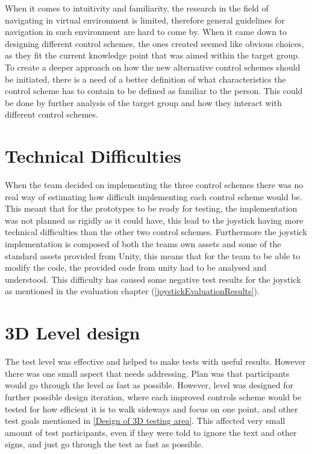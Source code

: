 When it comes to intuitivity and familiarity, the research in the field of navigating in virtual environment is limited, therefore general guidelines for navigation in such environment are hard to come by. When it came down to designing different control schemes, the ones created seemed like obvious choices, as they fit the current knowledge point that was aimed within the target group. To create a deeper approach on how the new alternative control schemes should be initiated, there is a need of a better definition of what characteristics the control scheme has to contain to be defined as familiar to the person. This could be done by further analysis of the target group and how they interact with different control schemes.

\section*{Technical Difficulties}
When the team decided on implementing the three control schemes there was no real way of estimating how difficult implementing each control scheme would be. This meant that for the prototypes to be ready for testing, the implementation was not planned as rigidly as it could have, this lead to the joystick having more technical difficulties than the other two control schemes. Furthermore the joystick implementation is composed of both the teams own assets and some of the standard assets provided from Unity, this means that for the team to be able to modify the code, the provided code from unity had to be analysed and understood. This difficulty has caused some negative test results for the joystick as mentioned in the evaluation chapter (\ref{joystickEvaluationResults}). 

\section*{3D Level design}
The test level was effective and helped to make tests with useful results. However there was one small aspect that needs addressing. Plan was that participants would go through the level as fast as possible. However, level was designed for further possible design iteration, where each improved controls scheme would be tested for how efficient it is to walk sideways and focus on one point, and other test goals mentioned in \ref {Design of 3D testing area}. This affected very small amount of test participants, even if they were told to ignore the text and other signs, and just go through the test as fast as possible. 

